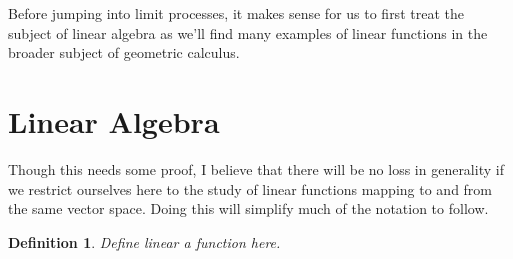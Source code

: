 \documentclass[12pt]{article}
\newtheorem{definition}{Definition}[section]
\begin{document}
Before jumping into limit processes, it makes sense for us to first treat the subject
of linear algebra as we'll find many examples of linear functions in the broader
subject of geometric calculus.

\section{Linear Algebra}

Though this needs some proof, I believe that there will be no loss in generality if
we restrict ourselves here to the study of linear functions mapping to and from the
same vector space.  Doing this will simplify much of the notation to follow.
\begin{definition}
Define linear a function here.
\end{definition}
\end{document}
